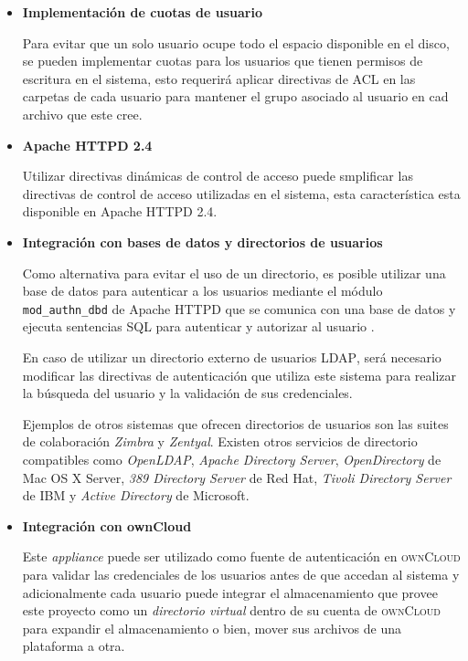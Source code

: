 \begin{itemize}
  \item \textbf{Implementaci\'{o}n de cuotas de usuario}

Para evitar que un solo usuario ocupe todo el espacio disponible en el disco, se pueden implementar cuotas para los usuarios que tienen permisos de escritura en el sistema, esto requerir\'{a} aplicar directivas de \textsc{ACL} en las carpetas de cada usuario para mantener el grupo asociado al usuario en cad archivo que este cree. 

  \item \textbf{Apache HTTPD 2.4}

Utilizar directivas din\'{a}micas de control de acceso puede smplificar las directivas de control de acceso utilizadas en el sistema, esta caracter\'{i}stica esta disponible en Apache \textsc{HTTPD} 2.4. %

  \item \textbf{Integraci\'{o}n con bases de datos y directorios de usuarios}


Como alternativa para evitar el uso de un directorio, es posible utilizar una base de datos para autenticar a los usuarios mediante el m\'{o}dulo \texttt{mod\_authn\_dbd} de Apache \textsc{HTTPD} que se comunica con una base de datos y ejecuta sentencias \textsc{SQL} para autenticar y autorizar al usuario .%

En caso de utilizar un directorio externo de usuarios \textsc{LDAP}, ser\'{a} necesario modificar las directivas de autenticaci\'{o}n que utiliza este sistema para realizar la b\'{u}squeda del usuario y la validaci\'{o}n de sus credenciales.

Ejemplos de otros sistemas que ofrecen directorios de usuarios son las suites de colaboraci\'{o}n \textsl{Zimbra} y \textsl{Zentyal}.  Existen otros servicios de directorio compatibles como \textit{OpenLDAP}, \textit{Apache Directory Server}, \textit{OpenDirectory} de Mac OS X Server, \textit{389 Directory Server} de Red Hat, \textit{Tivoli Directory Server} de IBM y \textit{Active Directory} de Microsoft.

  \item \textbf{Integraci\'{o}n con ownCloud}

Este \textsl{appliance} puede ser utilizado como fuente de autenticaci\'{o}n en \textsc{ownCloud} para validar las credenciales de los usuarios antes de que accedan al sistema y adicionalmente cada usuario puede integrar el almacenamiento que provee este proyecto como un \textsl{directorio virtual} dentro de su cuenta de \textsc{ownCloud} para expandir el almacenamiento o bien, mover sus archivos de una plataforma a otra.

\end{itemize}

